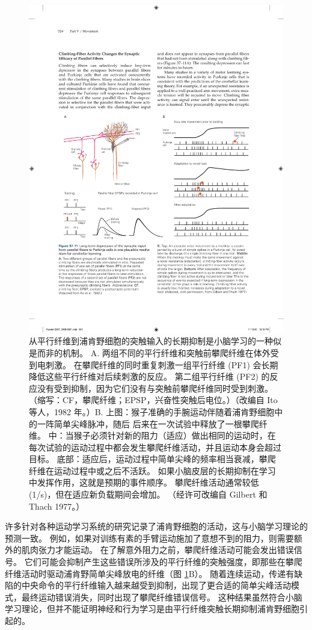 \begin{figure}[htbp]
	\centering
	\includegraphics[width=0.9\linewidth]{chap37/fig_37_11}
	\caption{从平行纤维到浦肯野细胞的突触输入的长期抑制是小脑学习的一种似是而非的机制。 A. 两组不同的平行纤维和突触前攀爬纤维在体外受到电刺激。 在攀爬纤维的同时重复刺激一组平行纤维 (PF1) 会长期降低这些平行纤维对后续刺激的反应。 第二组平行纤维 (PF2) 的反应没有受到抑制，因为它们没有与突触前攀爬纤维同时受到刺激。 （缩写：CF，攀爬纤维；EPSP，兴奋性突触后电位。）（改编自 Ito 等人，1982 年。）B. 上图：猴子准确的手腕运动伴随着浦肯野细胞中的一阵简单尖峰脉冲，随后 后来在一次试验中释放了一根攀爬纤维。 中：当猴子必须针对新的阻力（适应）做出相同的运动时，在每次试验的运动过程中都会发生攀爬纤维活动，并且运动本身会超过目标。 底部：适应后，运动过程中简单尖峰的频率相当衰减，攀爬纤维在运动过程中或之后不活跃。 如果小脑皮层的长期抑制在学习中发挥作用，这就是预期的事件顺序。 攀爬纤维活动通常较低 (1/s)，但在适应新负载期间会增加。 （经许可改编自 Gilbert 和 Thach 1977。）}
	\label{fig:37_11}
\end{figure}

许多针对各种运动学习系统的研究记录了浦肯野细胞的活动，这与小脑学习理论的预测一致。 例如，如果对训练有素的手臂运动施加了意想不到的阻力，则需要额外的肌肉张力才能运动。 在了解意外阻力之前，攀爬纤维活动可能会发出错误信号。 它们可能会抑制产生这些错误所涉及的平行纤维的突触强度，即那些在攀爬纤维活动时驱动浦肯野简单尖峰放电的纤维（图 \ref{fig:37_11}B）。 随着连续运动，传递有缺陷的中央命令的平行纤维输入越来越受到抑制，出现了更合适的简单尖峰活动模式，最终运动错误消失，同时出现了攀爬纤维错误信号。 这种结果虽然符合小脑学习理论，但并不能证明神经和行为学习是由平行纤维突触长期抑制浦肯野细胞引起的。

